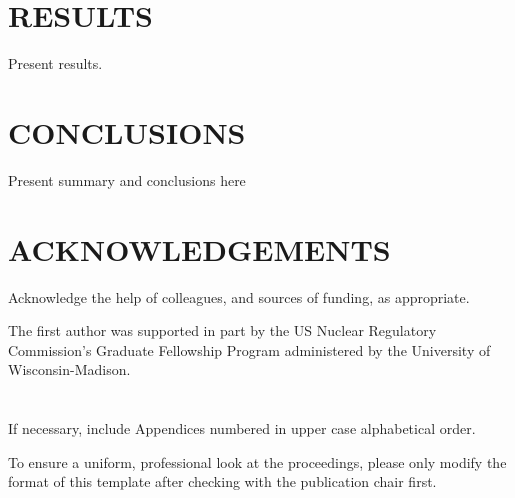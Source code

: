 \documentclass[letterpaper]{physor2024}
\begin{document}
\section{RESULTS}\label{sec:results}
Present results.

\section{CONCLUSIONS}\label{sec:conclusions}
Present summary and conclusions here

\section*{ACKNOWLEDGEMENTS}
Acknowledge the help of colleagues, and sources of funding, as appropriate.

The first author was supported in part by the US Nuclear Regulatory Commission's Graduate Fellowship Program administered by the University of Wisconsin-Madison.

\printglossaries




\appendix

\section{}
If necessary, include Appendices numbered in upper case alphabetical order.

To ensure a uniform, professional look at the proceedings, please only modify the format of this template after checking with the publication chair first.
\end{document}
